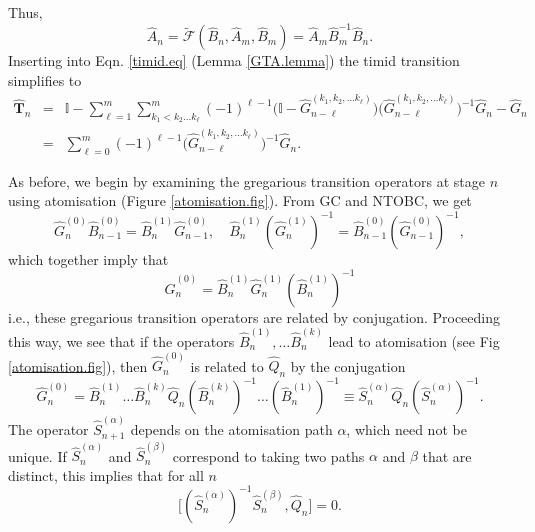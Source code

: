 \documentclass[11pt]{article}
\newcommand{\hA}{\hat { A}}
\newcommand{\hG}{\hat G}
\newcommand{\hQ}{\hat Q}
\newcommand{\hB}{\hat B}
\newcommand{\hS}{\hat S}
\newcommand{\hTi}{\widehat{\mathbf{T}}}
\newcommand{\tcF}{\widetilde{\mathcal F}}
\newcommand{\id}{\mathbb I}
\begin{document}
Thus, 
\begin{equation}
\hA_n=\tcF(\hB_n,\hA_m,\hB_m) =   \hA_m\hB_m^{-1} \hB_n. 
\end{equation} 
Inserting into Eqn. \eqref{timid.eq} (Lemma \ref{GTA.lemma}) the timid
transition simplifies to
\begin{eqnarray} 
\hTi_n & = &  \id - \sum_{\ell =1}^m \sum_{k_1 < k_2 \ldots k_\ell}^m
(-1)^{\ell -1} \bigl(\id - \hG_{n-\ell}^{(k_1,k_2, \ldots k_\ell)} \bigr)
\bigl(\hG_{n-\ell}^{(k_1,k_2, \ldots k_\ell)}\bigr)^{-1} \hG_n -\hG_n
             \nonumber \\
  &=&  \sum_{\ell =0}^m (-1)^{\ell -1} \bigl(\hG_{n-\ell}^{(k_1,k_2,
      \ldots k_\ell)}\bigr)^{-1} \hG_n. 
 \end{eqnarray} 

 
As before, we begin by examining the gregarious transition operators
at stage $n$ using atomisation (Figure \ref{atomisation.fig}).  From
GC and NTOBC, we get 
\begin{equation}
\hG_{n}^{(0)} \hB_{n-1}^{(0)}=\hB_{n}^{(1)} \hG_{n-1}^{(0)},  \quad 
\hB_{n}^{(1)}(\hG_{n}^{(1)})^ {-1}=\hB_{n-1}^{(0)}
(\hG_{n-1}^{(0)})^{-1}, \label{GCNTOBC.eq}
\end{equation}
which together imply that
\begin{equation}
\hG_{n}^{(0)} = \hB_{n}^{(1)} \hG_{n}^{(1)} (\hB_{n}^{(1)})^{-1}
\end{equation}
i.e.,  these  gregarious transition operators are related by
conjugation.  Proceeding this way, we see
that if the operators $\hB_{n}^{(1)}, \ldots  \hB_{n}^{(k)}$  lead to
atomisation  (see  Fig \ref{atomisation.fig}), then $\hG_{n}^{(0)}$ is related to
$\hQ_{n}$ by the conjugation 
\begin{equation}
\hG_{n}^{(0)} = \hB_{n}^{(1)} \ldots
\hB_{n}^{(k)} \hQ_{n} (\hB_{n}^{(k)}) ^{-1} \ldots
(\hB_{n}^{(1)})^{-1} \equiv  \hS_{n}^{(\alpha)} \hQ_{n}
(\hS_{n}^{(\alpha)})^{-1}. \label{conjugate.eq}  
\end{equation}
The operator $\hS_{n+1}^{(\alpha)}$ depends  on the
atomisation path  $\alpha$, which 
need not be unique. If   $\hS_{n}^{(\alpha)}$ and $\hS_{n}^{(\beta)}$
correspond to taking two paths $\alpha$ and $\beta$  that are distinct, this implies that for all $n$
\begin{equation}
\bigl[(\hS_{n}^{(\alpha)})^{-1}\hS_{n}^{(\beta)},
\hQ_{n}\bigr]=0. 
\end{equation} 
\end{document}
